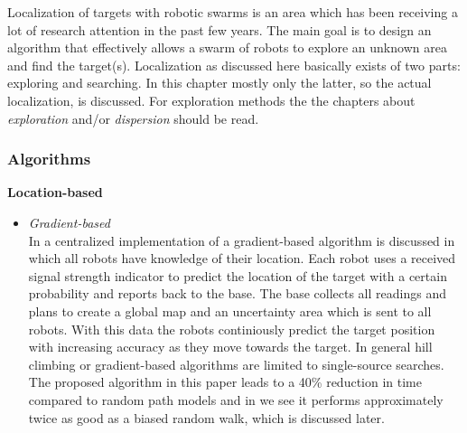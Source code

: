 
Localization of targets with robotic swarms is an area which has been receiving a lot of research attention in the past few years. 
The main goal is to design an algorithm that effectively allows a swarm of robots to explore an unknown area and find the target(s).
Localization as discussed here basically exists of two parts: exploring and searching.
In this chapter mostly only the latter, so the actual localization, is discussed.
For exploration methods the the chapters about \emph{exploration} and/or \emph{dispersion} should be read.

\subsubsection{Algorithms}

	\textbf{Location-based}
	\begin{itemize}
		\item
		\textit{Gradient-based}\\
		In \cite{zhang2009gradient} a centralized implementation of a gradient-based algorithm is discussed in which all robots have knowledge of their location.
		Each robot uses a received signal strength indicator to predict the location of the target with a certain probability and reports back to the base.
		The base collects all readings and plans to create a global map and an uncertainty area which is sent to all robots.
		With this data the robots continiously predict the target position with increasing accuracy as they move towards the target.
		In general hill climbing or gradient-based algorithms are limited to single-source searches.
		The proposed algorithm in this paper leads to a 40\% reduction in time compared to random path models and in \cite{dhariwal2004bacterium} we see it performs approximately twice as good as a biased random walk, which is discussed later.
	\end{itemize}

